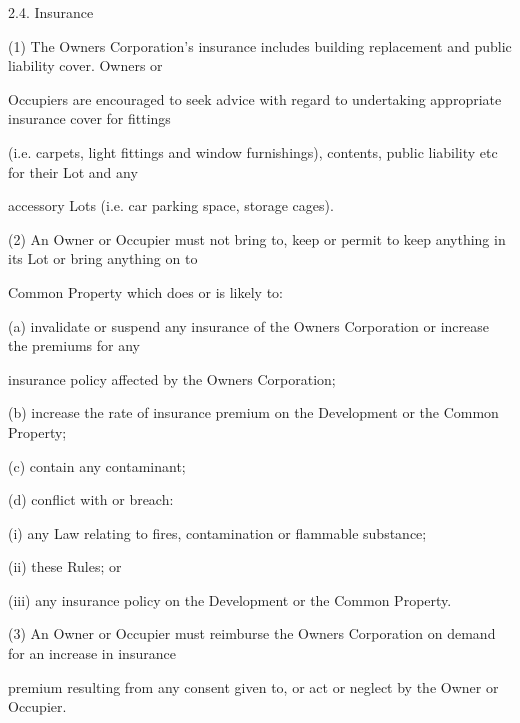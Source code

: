 \documentclass{article}
\begin{document}
\newpage


















{\fontsize{9.99}{1}2.4. Insurance }


{\fontsize{9.962}{1}(1) The Owners Corporation’s insurance includes building replacement and public liability cover. Owners or }

{\fontsize{10.02}{1}Occupiers are encouraged to seek advice with regard to undertaking appropriate insurance cover for fittings }

{\fontsize{10.02}{1}(i.e. carpets, light fittings and window furnishings), contents, public liability etc for their Lot and any }

{\fontsize{10.02}{1}accessory Lots (i.e. car parking space, storage cages). }

{\fontsize{9.962}{1}(2) An Owner or Occupier must not bring to, keep or permit to keep anything in its Lot or bring anything on to }

{\fontsize{10.02}{1}Common Property which does or is likely to: }

{\fontsize{9.962}{1}(a) invalidate or suspend any insurance of the Owners Corporation or increase the premiums for any }

{\fontsize{10.02}{1}insurance policy affected by the Owners Corporation; }

{\fontsize{9.962}{1}(b) increase the rate of insurance premium on the Development or the Common Property; }

{\fontsize{9.962}{1}(c) contain any contaminant; }

{\fontsize{9.962}{1}(d) conflict with or breach: }

{\fontsize{9.962}{1}(i) any Law relating to fires, contamination or flammable substance; }

{\fontsize{9.962}{1}(ii) these Rules; or }

{\fontsize{9.962}{1}(iii) any insurance policy on the Development or the Common Property. }

{\fontsize{9.962}{1}(3) An Owner or Occupier must reimburse the Owners Corporation on demand for an increase in insurance }

{\fontsize{10.02}{1}premium resulting from any consent given to, or act or neglect by the Owner or Occupier. }
\end{document}
